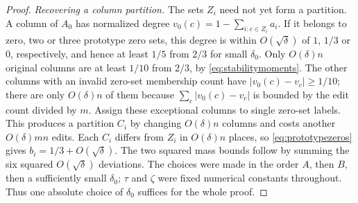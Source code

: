 \documentclass[10pt,a4paper]{amsart}
\begin{document}
\begin{proof}
\smallskip\noindent\emph{Recovering a column partition.}
The sets $Z_i$ need not yet form a partition. A column of $A_0$ has normalized degree
$v_0(c)=1-\sum_{i:c\in Z_i}a_i$.
If it belongs to zero, two or three prototype zero sets, this degree is
within $O(\sqrt\delta)$ of $1$, $1/3$ or $0$, respectively, and hence
at least $1/5$ from $2/3$ for small $\delta_0$.
Only $O(\delta)n$ original columns are at
least $1/10$ from $2/3$, by \eqref{eq:stabilitymoments}.
The other columns with an invalid zero-set membership count have
$|v_0(c)-v_c|\ge1/10$; there are only $O(\delta)n$ of them because
$\sum_c|v_0(c)-v_c|$ is bounded by the edit count divided by $m$.
Assign these exceptional columns to single zero-set labels. This produces
a partition $C_i$ by changing $O(\delta)n$ columns and costs another
$O(\delta)mn$ edits. Each $C_i$ differs from $Z_i$ in $O(\delta)n$ places,
so \eqref{eq:prototypezeros} gives $b_i=1/3+O(\sqrt\delta)$.
The two squared mass bounds follow by summing the six squared
$O(\sqrt\delta)$ deviations. The choices were made in the order
$A$, then $B$, then a sufficiently small $\delta_0$; $\tau$ and $\zeta$
were fixed numerical constants throughout. Thus one absolute choice of
$\delta_0$ suffices for the whole proof.
\end{proof}
\end{document}
